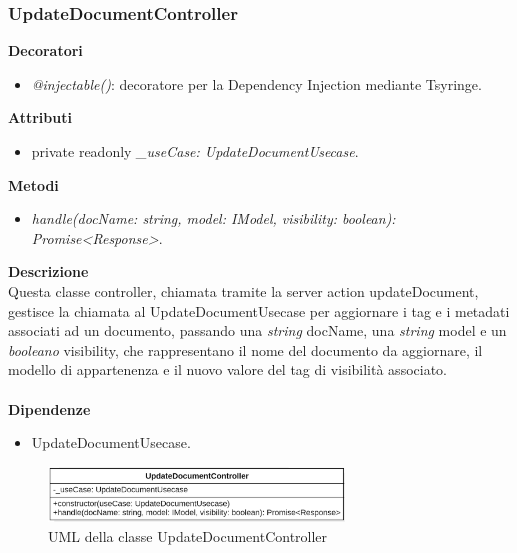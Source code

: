 \subsubsection{UpdateDocumentController}
\textbf{Decoratori}
\begin{itemize}
    \item \textit{@injectable()}: decoratore per la Dependency Injection mediante Tsyringe.
\end{itemize}
\textbf{Attributi}
\begin{itemize}
    \item private readonly \textit{\_useCase: UpdateDocumentUsecase}.
\end{itemize}
\textbf{Metodi}
\begin{itemize}
    \item \textit{handle(docName: string, model: IModel, visibility: boolean): Promise<Response>}.
\end{itemize}
\textbf{Descrizione}\\
Questa classe controller, chiamata tramite la server action updateDocument, gestisce la chiamata al UpdateDocumentUsecase per aggiornare i tag e i metadati associati ad un documento, passando una \textit{string} docName, una \textit{string} model e un \textit{booleano} visibility, che rappresentano il nome del documento da aggiornare, il modello di appartenenza e il nuovo valore del tag di visibilità associato.\\ \\
\textbf{Dipendenze}
\begin{itemize}
    \item UpdateDocumentUsecase.
\end{itemize}

\begin{figure}[h!]
    \centering  
    \includegraphics[width=0.7\textwidth]{UpdateDocumentController.png}
    \caption{UML della classe UpdateDocumentController}
\end{figure}

